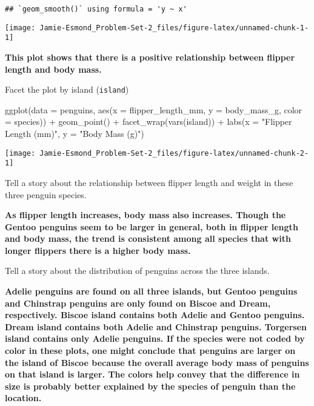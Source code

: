 \documentclass[
]{article}
\newenvironment{Shaded}{\begin{snugshade}}{\end{snugshade}}
\newcommand{\AttributeTok}[1]{\textcolor[rgb]{0.77,0.63,0.00}{#1}}
\newcommand{\FunctionTok}[1]{\textcolor[rgb]{0.00,0.00,0.00}{#1}}
\newcommand{\NormalTok}[1]{#1}
\newcommand{\SpecialCharTok}[1]{\textcolor[rgb]{0.00,0.00,0.00}{#1}}
\newcommand{\StringTok}[1]{\textcolor[rgb]{0.31,0.60,0.02}{#1}}
\begin{document}
\begin{verbatim}
## `geom_smooth()` using formula = 'y ~ x'
\end{verbatim}

\begin{center}\texttt{[image: Jamie-Esmond\_Problem-Set-2\_files/figure-latex/unnamed-chunk-1-1]} \end{center}

\textbf{This plot shows that there is a positive relationship between
flipper length and body mass. }

Facet the plot by island (\texttt{island})

\begin{Shaded}
\begin{Highlighting}[]
\FunctionTok{ggplot}\NormalTok{(}\AttributeTok{data =}\NormalTok{ penguins,}
       \FunctionTok{aes}\NormalTok{(}\AttributeTok{x =}\NormalTok{ flipper\_length\_mm, }\AttributeTok{y =}\NormalTok{ body\_mass\_g, }\AttributeTok{color =}\NormalTok{ species)) }\SpecialCharTok{+}
  \FunctionTok{geom\_point}\NormalTok{() }\SpecialCharTok{+}
  \FunctionTok{facet\_wrap}\NormalTok{(}\FunctionTok{vars}\NormalTok{(island)) }\SpecialCharTok{+}
  \FunctionTok{labs}\NormalTok{(}\AttributeTok{x =} \StringTok{"Flipper Length (mm)"}\NormalTok{, }
       \AttributeTok{y =} \StringTok{"Body Mass (g)"}\NormalTok{)}
\end{Highlighting}
\end{Shaded}

\begin{center}\texttt{[image: Jamie-Esmond\_Problem-Set-2\_files/figure-latex/unnamed-chunk-2-1]} \end{center}

Tell a story about the relationship between flipper length and weight in
these three penguin species.

\textbf{As flipper length increases, body mass also increases. Though
the Gentoo penguins seem to be larger in general, both in flipper length
and body mass, the trend is consistent among all species that with
longer flippers there is a higher body mass.}

Tell a story about the distribution of penguins across the three
islands.

\textbf{Adelie penguins are found on all three islands, but Gentoo
penguins and Chinstrap penguins are only found on Biscoe and Dream,
respectively. Biscoe island contains both Adelie and Gentoo penguins.
Dream island contains both Adelie and Chinstrap penguins. Torgersen
island contains only Adelie penguins. If the species were not coded by
color in these plots, one might conclude that penguins are larger on the
island of Biscoe because the overall average body mass of penguins on
that island is larger. The colors help convey that the difference in
size is probably better explained by the species of penguin than the
location.}
\end{document}
